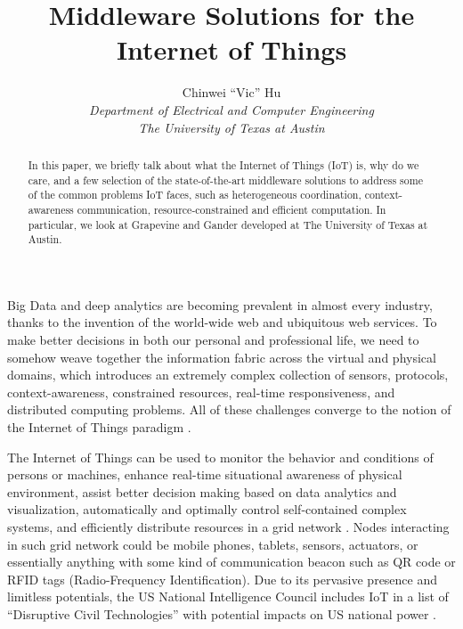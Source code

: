 \documentclass[11pt,onecolumn]{article}
\begin{document}
%
\title{Middleware Solutions for the Internet of Things}



\author{
Chinwei ``Vic'' Hu\\
{\small \textit{Department of Electrical and Computer Engineering} }\\
{\small \textit{The University of Texas at Austin}}
}


\maketitle


\begin{abstract}
In this paper, we briefly talk about what the Internet of Things (IoT) is, why do we care, and a few selection of the state-of-the-art middleware solutions to address some of the common problems IoT faces, such as heterogeneous coordination, context-awareness communication, resource-constrained and efficient computation. In particular, we look at Grapevine \cite{grapevine} and Gander \cite{michel2013gander} developed at The University of Texas at Austin.
\end{abstract}

Big Data \cite{manyika2011big} and deep analytics are becoming prevalent in almost every industry, thanks to the invention of the world-wide web \cite{berners1994world} and ubiquitous web services. To make better decisions in both our personal and professional life, we need to somehow weave together the information fabric across the virtual and physical domains, which introduces an extremely complex collection of sensors, protocols, context-awareness, constrained resources, real-time responsiveness, and distributed computing problems. All of these challenges converge to the notion of the Internet of Things paradigm \cite{atzori2010internet}.

The Internet of Things can be used to monitor the behavior and conditions of persons or machines, enhance real-time situational awareness of physical environment, assist better decision making based on data analytics and visualization, automatically and optimally control self-contained complex systems, and efficiently distribute resources in a grid network \cite{chui2010internet}. Nodes interacting in such grid network could be mobile phones, tablets, sensors, actuators, or essentially anything with some kind of communication beacon such as QR code or RFID tags \cite{welbourne2009building}(Radio-Frequency Identification). Due to its pervasive presence and limitless potentials, the US National Intelligence Council includes IoT in a list of ``Disruptive Civil Technologies'' with potential impacts on US national power \cite{officialdisruptive}.
\end{document}
